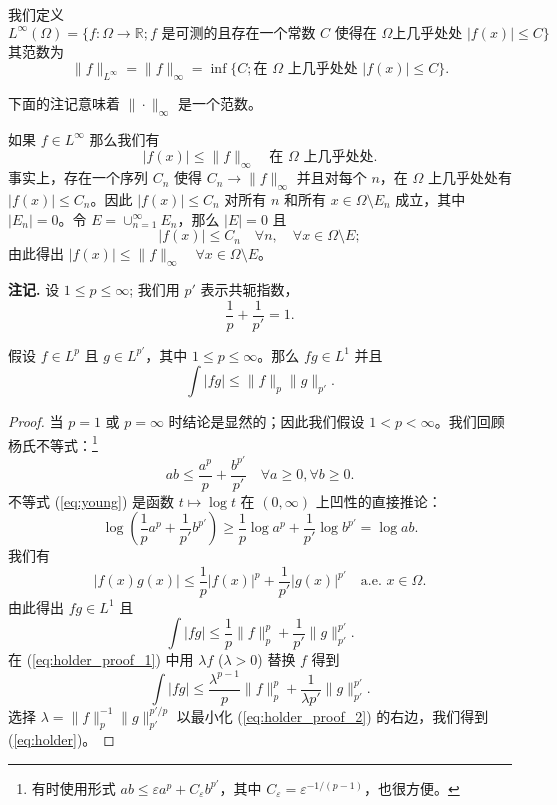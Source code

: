 \begin{definition}
我们定义
\[ L^\infty(\Omega) = \{f: \Omega \to \mathbb{R}; f \text{ 是可测的且存在一个常数 } C \text{ 使得在 } \Omega \text{上几乎处处 } |f(x)| \le C \} \]
其范数为
\[ \|f\|_{L^\infty} = \|f\|_\infty = \inf\{C; \text{在 } \Omega \text{ 上几乎处处 } |f(x)| \le C \}. \]
\end{definition}
下面的注记意味着 $\| \cdot \|_\infty$ 是一个范数。

\begin{remark}
如果 $f \in L^\infty$ 那么我们有
\[ |f(x)| \le \|f\|_\infty \quad \text{在 } \Omega \text{ 上几乎处处}. \]
事实上，存在一个序列 $C_n$ 使得 $C_n \to \|f\|_\infty$ 并且对每个 $n$，在 $\Omega$ 上几乎处处有 $|f(x)| \le C_n$。因此 $|f(x)| \le C_n$ 对所有 $n$ 和所有 $x \in \Omega \setminus E_n$ 成立，其中 $|E_n|=0$。令 $E = \cup_{n=1}^\infty E_n$，那么 $|E|=0$ 且
\[ |f(x)| \le C_n \quad \forall n, \quad \forall x \in \Omega \setminus E; \]
由此得出 $|f(x)| \le \|f\|_\infty \quad \forall x \in \Omega \setminus E$。
\end{remark}

\textbf{注记.} 设 $1 \le p \le \infty$; 我们用 $p'$ 表示共轭指数，
\[ \frac{1}{p} + \frac{1}{p'} = 1. \]

\begin{theorem}\label{theorem4.6}
假设 $f \in L^p$ 且 $g \in L^{p'}$，其中 $1 \le p \le \infty$。那么 $fg \in L^1$ 并且
\begin{equation}\label{eq:holder}
\int |fg| \le \|f\|_p \|g\|_{p'}.
\end{equation}
\end{theorem}

\begin{proof}
当 $p=1$ 或 $p=\infty$ 时结论是显然的；因此我们假设 $1 < p < \infty$。我们回顾杨氏不等式：\footnote{有时使用形式 $ab \le \varepsilon a^p + C_\varepsilon b^{p'}$，其中 $C_\varepsilon = \varepsilon^{-1/(p-1)}$，也很方便。}
\begin{equation}\label{eq:young}
ab \le \frac{a^p}{p} + \frac{b^{p'}}{p'} \quad \forall a \ge 0, \forall b \ge 0.
\end{equation}
不等式 (\ref{eq:young}) 是函数 $t \mapsto \log t$ 在 $(0, \infty)$ 上凹性的直接推论：
\[ \log\left(\frac{1}{p}a^p + \frac{1}{p'}b^{p'}\right) \ge \frac{1}{p}\log a^p + \frac{1}{p'}\log b^{p'} = \log ab. \]
我们有
\[ |f(x)g(x)| \le \frac{1}{p}|f(x)|^p + \frac{1}{p'}|g(x)|^{p'} \quad \text{a.e. } x \in \Omega. \]
由此得出 $fg \in L^1$ 且
\begin{equation}\label{eq:holder_proof_1}
\int |fg| \le \frac{1}{p}\|f\|_p^p + \frac{1}{p'}\|g\|_{p'}^{p'}.
\end{equation}
在 (\ref{eq:holder_proof_1}) 中用 $\lambda f$ ($\lambda > 0$) 替换 $f$ 得到
\begin{equation}\label{eq:holder_proof_2}
\int |fg| \le \frac{\lambda^{p-1}}{p}\|f\|_p^p + \frac{1}{\lambda p'}\|g\|_{p'}^{p'}.
\end{equation}
选择 $\lambda = \|f\|_p^{-1} \|g\|_{p'}^{p'/p}$ 以最小化 (\ref{eq:holder_proof_2}) 的右边，我们得到 (\ref{eq:holder})。
\end{proof}


